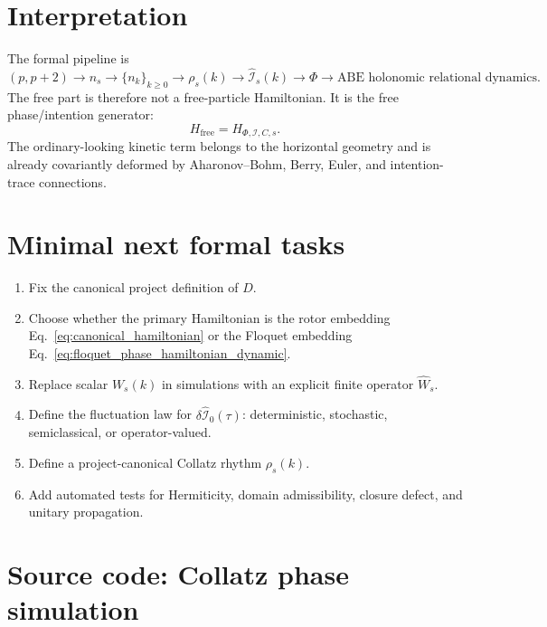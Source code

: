 \documentclass[11pt,a4paper]{article}
\newcommand{\Iop}{\hat{\mathcal I}}
\newcommand{\Wop}{\hat W}
\begin{document}
\section{Interpretation}

The formal pipeline is
\begin{equation}
\boxed{
  (p,p+2)
  \longrightarrow
  n_s
  \longrightarrow
  \{n_k\}_{k\ge0}
  \longrightarrow
  \rho_s(k)
  \longrightarrow
  \Iop_s(k)
  \longrightarrow
  \Phi
  \longrightarrow
  \text{ABE holonomic relational dynamics}.}
\end{equation}
The free part is therefore not a free-particle Hamiltonian. It is the free phase/intention generator:
\begin{equation}
\boxed{
  H_{\mathrm{free}}
  =H_{\Phi,\mathcal I,C,s}.}
\end{equation}
The ordinary-looking kinetic term belongs to the horizontal geometry and is already covariantly deformed by Aharonov--Bohm, Berry, Euler, and intention-trace connections.

\section{Minimal next formal tasks}

\begin{enumerate}[leftmargin=*]
  \item Fix the canonical project definition of $D$.
  \item Choose whether the primary Hamiltonian is the rotor embedding Eq.~\eqref{eq:canonical_hamiltonian} or the Floquet embedding Eq.~\eqref{eq:floquet_phase_hamiltonian_dynamic}.
  \item Replace scalar $W_s(k)$ in simulations with an explicit finite operator $\Wop_s$.
  \item Define the fluctuation law for $\delta\Iop_0(\tau)$: deterministic, stochastic, semiclassical, or operator-valued.
  \item Define a project-canonical Collatz rhythm $\rho_s(k)$.
  \item Add automated tests for Hermiticity, domain admissibility, closure defect, and unitary propagation.
\end{enumerate}

\appendix
\section{Source code: Collatz phase simulation}

\end{document}
